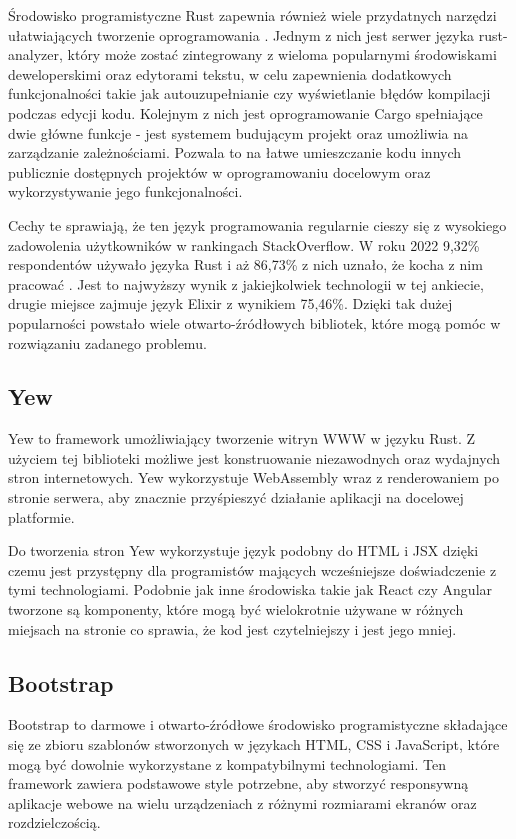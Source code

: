Środowisko programistyczne Rust zapewnia również wiele przydatnych narzędzi
ułatwiających tworzenie oprogramowania \cite{klabnik:rust}.
Jednym z nich jest serwer języka rust-analyzer, który może zostać zintegrowany
z wieloma popularnymi środowiskami deweloperskimi oraz edytorami tekstu,
w celu zapewnienia dodatkowych funkcjonalności takie jak
autouzupełnianie czy wyświetlanie błędów kompilacji podczas edycji kodu.
Kolejnym z nich jest oprogramowanie Cargo spełniające dwie główne funkcje - 
jest systemem budującym projekt oraz umożliwia na zarządzanie zależnościami.
Pozwala to na łatwe umieszczanie kodu innych publicznie dostępnych projektów
w oprogramowaniu docelowym oraz wykorzystywanie jego funkcjonalności.

Cechy te sprawiają, że ten język programowania regularnie cieszy się z
wysokiego zadowolenia użytkowników w rankingach StackOverflow.
W roku 2022 9,32\% respondentów używało języka Rust i aż 86,73\% z nich
uznało, że kocha z nim pracować \cite{stackoverflow:popularity}.
Jest to najwyższy wynik z jakiejkolwiek technologii w tej ankiecie,
drugie miejsce zajmuje język Elixir z wynikiem 75,46\%.
Dzięki tak dużej popularności powstało wiele otwarto-źródłowych bibliotek,
które mogą pomóc w rozwiązaniu zadanego problemu.

\subsection*{Yew}
Yew to framework umożliwiający tworzenie witryn WWW w języku Rust.
Z użyciem tej biblioteki możliwe jest konstruowanie niezawodnych
oraz wydajnych stron internetowych. Yew wykorzystuje WebAssembly wraz
z renderowaniem po stronie serwera, aby znacznie przyśpieszyć działanie
aplikacji na docelowej platformie.

Do tworzenia stron Yew wykorzystuje język podobny do HTML i JSX dzięki
czemu jest przystępny dla programistów mających wcześniejsze doświadczenie
z tymi technologiami. Podobnie jak inne środowiska takie jak React czy Angular
tworzone są komponenty, które mogą być wielokrotnie używane w różnych miejsach
na stronie co sprawia, że kod jest czytelniejszy i jest jego mniej.

\subsection*{Bootstrap}
Bootstrap to darmowe i otwarto-źródłowe środowisko programistyczne składające się
ze zbioru szablonów stworzonych w językach HTML, CSS i JavaScript, które mogą
być dowolnie wykorzystane z kompatybilnymi technologiami.
Ten framework zawiera podstawowe style potrzebne, aby stworzyć responsywną 
aplikacje webowe na wielu urządzeniach z różnymi rozmiarami ekranów oraz rozdzielczością. 

